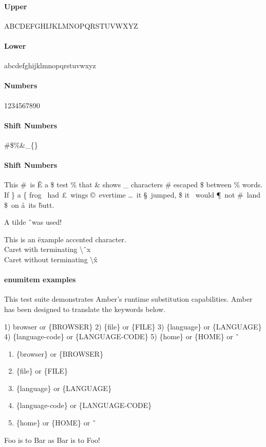 \documentclass[14pt]{article}%
\begin{document}
%

\paragraph{Upper}
ABCDEFGHIJKLMNOPQRSTUVWXYZ

\paragraph{Lower}
abcdefghijklmnopqrstuvwxyz

\paragraph{Numbers}
1234567890

\paragraph{Shift Numbers}
\#\$\%\&\_\{\}

\paragraph{Shift Numbers}
This \#\ is \v{E} a \$ test \% that \& shows \_ characters \# escaped \$ between \%
words.  If \} a \{ frog \ddag\ had \pounds\ wings \copyright\ evertime \dots\
it \S\ jumped, \$ it \dag\ would \P\ not \#\ land \$\ on \aa\ its \^ butt.

A tilde \~\ was used!

This is an \"{e}xample accented character.
\\
Caret with terminating \textbackslash \^\ x
\\
Caret without terminating \textbackslash \^ x

\paragraph{enumitem examples}
\begin{description}[align=right,leftmargin=3.2cm,labelindent=3.0cm]
  \item[Purpose:]
    This test suite demonstrates Amber's runtime substitution capabilities.
    Amber has been designed to translate the keywords below.

    1) {browser} or \{BROWSER\}
    2) \{file\} or \{FILE\}
    3) \{language\} or \{LANGUAGE\}
    4) \{language-code\} or \{LANGUAGE-CODE\}
    5) \{home\} or \{HOME\} or \~\

    \begin{enumerate}
      \item \{browser\} or \{BROWSER\}
      \item \{file\} or \{FILE\}
      \item \{language\} or \{LANGUAGE\}
      \item \{language-code\} or \{LANGUAGE-CODE\}
      \item \{home\} or \{HOME\} or \~\
    \end{enumerate}

  \item[Foo:] Foo is to Bar as Bar is to Foo!

\end{description}
\end{document}
